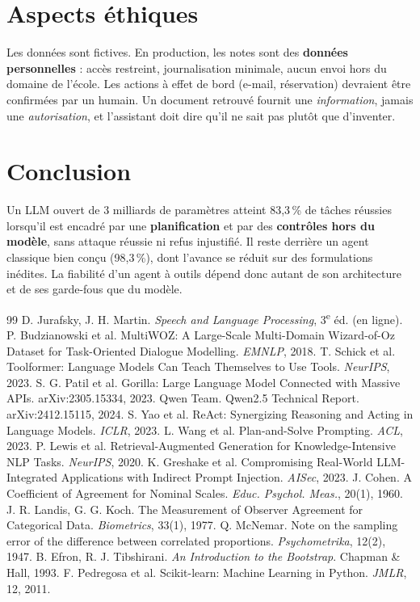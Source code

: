 \documentclass[10pt,a4paper]{article}
\begin{document}
\section{Aspects éthiques}
Les données sont fictives. En production, les notes sont des \textbf{données personnelles} : accès restreint,
journalisation minimale, aucun envoi hors du domaine de l'école. Les actions à effet de bord (e-mail,
réservation) devraient être confirmées par un humain. Un document retrouvé fournit une \emph{information}, jamais
une \emph{autorisation}, et l'assistant doit dire qu'il ne sait pas plutôt que d'inventer.

\section{Conclusion}
Un LLM ouvert de 3 milliards de paramètres atteint 83,3\,\% de tâches réussies lorsqu'il est encadré par une
\textbf{planification} et par des \textbf{contrôles hors du modèle}, sans attaque réussie ni refus injustifié. Il
reste derrière un agent classique bien conçu (98,3\,\%), dont l'avance se réduit sur des formulations inédites.
La fiabilité d'un agent à outils dépend donc autant de son architecture et de ses garde-fous que du modèle.

\begingroup
\footnotesize
\setlength{\itemsep}{0pt}
\renewcommand{\refname}{\large\color{vertfonce}Références}
\begin{thebibliography}{99}\setlength{\itemsep}{0pt}\setlength{\parskip}{0pt}
 D. Jurafsky, J. H. Martin. \emph{Speech and Language Processing}, 3\textsuperscript{e} éd. (en ligne).
 P. Budzianowski et al. MultiWOZ: A Large-Scale Multi-Domain Wizard-of-Oz Dataset for Task-Oriented Dialogue Modelling. \emph{EMNLP}, 2018.
 T. Schick et al. Toolformer: Language Models Can Teach Themselves to Use Tools. \emph{NeurIPS}, 2023.
 S. G. Patil et al. Gorilla: Large Language Model Connected with Massive APIs. arXiv:2305.15334, 2023.
 Qwen Team. Qwen2.5 Technical Report. arXiv:2412.15115, 2024.
 S. Yao et al. ReAct: Synergizing Reasoning and Acting in Language Models. \emph{ICLR}, 2023.
 L. Wang et al. Plan-and-Solve Prompting. \emph{ACL}, 2023.
 P. Lewis et al. Retrieval-Augmented Generation for Knowledge-Intensive NLP Tasks. \emph{NeurIPS}, 2020.
 K. Greshake et al. Compromising Real-World LLM-Integrated Applications with Indirect Prompt Injection. \emph{AISec}, 2023.
 J. Cohen. A Coefficient of Agreement for Nominal Scales. \emph{Educ. Psychol. Meas.}, 20(1), 1960.
 J. R. Landis, G. G. Koch. The Measurement of Observer Agreement for Categorical Data. \emph{Biometrics}, 33(1), 1977.
 Q. McNemar. Note on the sampling error of the difference between correlated proportions. \emph{Psychometrika}, 12(2), 1947.
 B. Efron, R. J. Tibshirani. \emph{An Introduction to the Bootstrap}. Chapman \& Hall, 1993.
 F. Pedregosa et al. Scikit-learn: Machine Learning in Python. \emph{JMLR}, 12, 2011.
\end{thebibliography}
\endgroup
\end{document}
